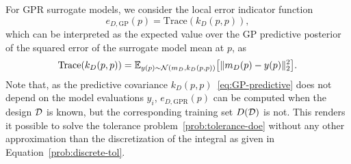 For GPR surrogate models, we consider the local error indicator function 
\begin{equation} \label{eq:loc-err-GP}
    e_{D, \text{GP}}(p) = \text{Trace} (k_D(p,p)),
\end{equation}
which can be interpreted as the expected value over the GP predictive posterior of the squared error of the surrogate model mean at $p$, as
\[
    \text{Trace} (k_D(p,p)) = \mathbb E_{y(p) \sim \mathcal N (m_D, k_D(p,p)) } \big[ \| m_{D}(p) - y(p)\|_2^2 \big].
\]
Note that, as the predictive covariance $k_D(p,p)$~\eqref{eq:GP-predictive} does not depend on the model evaluations $y_i$, $e_{D, \text{GPR}}(p)$ can be computed when the design $\mathcal D$ is known, but the corresponding training set $D(\mathcal D)$ is not. 
This renders it possible to solve the tolerance problem~\eqref{prob:tolerance-doe} without any other approximation than the discretization of the integral as given in Equation~\eqref{prob:discrete-tol}.  \medbreak

